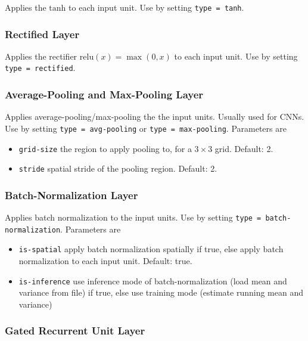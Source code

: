 Applies the $ \mathrm{tanh} $ to each input unit. Use by setting \texttt{type = tanh}.

\subsubsection*{Rectified Layer}

Applies the rectifier $ \mathrm{relu}(x) = \max(0, x) $ to each input unit. Use by setting \texttt{type = rectified}.

\subsubsection*{Average-Pooling and Max-Pooling Layer}

Applies average-pooling/max-pooling the the input units. Usually used for CNNs. Use by setting \texttt{type = avg-pooling} or \texttt{type = max-pooling}. Parameters are
\begin{itemize}
    \item \texttt{grid-size} the region to apply pooling to,  for a $ 3 \times 3 $ grid. Default: 2.
    \item \texttt{stride} spatial stride of the pooling region. Default: 2.
\end{itemize}

\subsubsection*{Batch-Normalization Layer}

Applies batch normalization to the input units. Use by setting \texttt{type = batch-normalization}. Parameters are
\begin{itemize}
    \item \texttt{is-spatial} apply batch normalization spatially if true, else apply batch normalization to each input unit. Default: true.
    \item \texttt{is-inference} use inference mode of batch-normalization (load mean and variance from file) if true, else use training mode (estimate running mean and variance)
\end{itemize}

\subsubsection*{Gated Recurrent Unit Layer}

